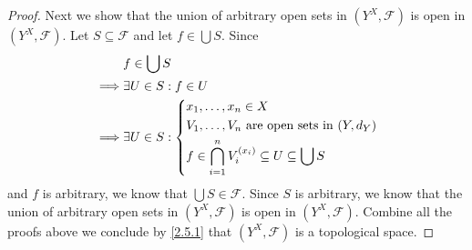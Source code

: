 \begin{proof}
  Next we show that the union of arbitrary open sets in \((Y^X, \mathcal{F})\) is open in \((Y^X, \mathcal{F})\).
  Let \(S \subseteq \mathcal{F}\) and let \(f \in \bigcup S\).
  Since
  \begin{align*}
             & f \in \bigcup S                                                                      \\
    \implies & \exists U \in S : f \in U                                                            \\
    \implies & \exists U \in S : \begin{dcases}
                                   x_1, \dots, x_n \in X                              \\
                                   V_1, \dots, V_n \text{ are open sets in } (Y, d_Y) \\
                                   f \in \bigcap_{i = 1}^n V_i^{(x_i)} \subseteq U \subseteq \bigcup S
                                 \end{dcases}
  \end{align*}
  and \(f\) is arbitrary, we know that \(\bigcup S \in \mathcal{F}\).
  Since \(S\) is arbitrary, we know that the union of arbitrary open sets in \((Y^X, \mathcal{F})\) is open in \((Y^X, \mathcal{F})\).
  Combine all the proofs above we conclude by \cref{2.5.1} that \((Y^X, \mathcal{F})\) is a topological space.


\end{proof}
